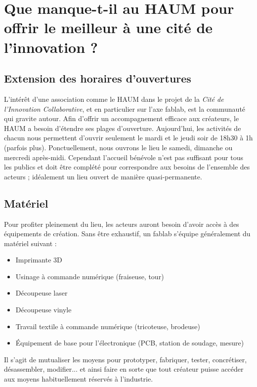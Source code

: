 \documentclass[a4paper,10pt]{scrartcl}
\begin{document}
\section{Que manque-t-il au HAUM pour offrir le meilleur à une cité de l'innovation ?}

\subsection*{Extension des horaires d'ouvertures}

L'intérêt d'une association comme le HAUM dans le projet de la \emph{Cité de l'Innovation Collaborative}, et en particulier sur l'axe fablab, est la communauté qui gravite autour.
Afin d'offrir un accompagnement efficace aux créateurs, le HAUM a besoin d'étendre ses plages d'ouverture. Aujourd'hui, les activités de chacun nous permettent d'ouvrir seulement le mardi et le jeudi soir de 18h30 à 1h (parfois plus). Ponctuellement, nous ouvrons le lieu le samedi, dimanche ou mercredi après-midi.
Cependant l'accueil bénévole n'est pas suffisant pour tous les publics et doit être complété pour correspondre aux besoins de l'ensemble des acteurs ; idéalement un lieu ouvert de manière quasi-permanente.

\subsection*{Matériel}

Pour profiter pleinement du lieu, les acteurs auront besoin d'avoir accès à des équipements de création.
Sans être exhaustif, un fablab s'équipe généralement du matériel suivant :

\begin{itemize}
 \item Imprimante 3D
 \item Usinage à commande numérique (fraiseuse, tour)
 \item Découpeuse laser
 \item Découpeuse vinyle
 \item Travail textile à commande numérique (tricoteuse, brodeuse)
 \item Équipement de base pour l'électronique (PCB, station de soudage, mesure)
\end{itemize}

Il s'agit de mutualiser les moyens pour prototyper, fabriquer, tester, concrétiser, désassembler, modifier... et ainsi faire en sorte que tout créateur puisse accéder aux moyens habituellement réservés à l'industrie.
\end{document}
